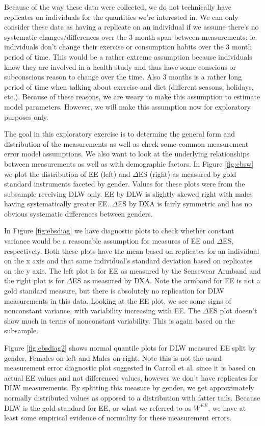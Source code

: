\documentclass[11pt]{article}\usepackage[]{graphicx}\usepackage[]{color}
\begin{document}
Because of the way these data were collected, we do not technically have replicates on individuals for the quantities we're interested in. We can only consider these data as having a replicate on an individual if we assume there's no systematic changes/differences over the 3 month span between measurements; ie. individuals don't change their exercise or consumption habits over the 3 month period of time. This would be a rather extreme assumption because individuals know they are involved in a health study and thus have some conscious or subconscious reason to change over the time. Also 3 months is a rather long period of time when talking about exercise and diet (different seasons, holidays, etc.). Because of these reasons, we are weary to make this assumption to estimate model parameters. However, we will make this assumption now for exploratory purposes only. 

The goal in this exploratory exercise is to determine the general form and distribution of the measurements as well as check some common measurement error model assumptions. We also want to look at the underlying relationships between measurements as well as with demographic factors. In Figure \eqref{fig:ebsw} we  plot the distribution of EE (left) and $\Delta$ES (right) as measured by gold standard instruments faceted by gender. Values for these plots were from the subsample receiving DLW only. EE by DLW is slightly skewed right with males having systematically greater EE. $\Delta$ES by DXA is fairly symmetric and has no obvious systematic differences between genders. 

In Figure \eqref{fig:ebsdiag} we have diagnostic plots to check whether constant variance would be a reasonable assumption for measures of EE and $\Delta$ES, respectively. Both these plots have the mean based on replicates for an individual on the x axis and that same individual's standard deviation based on replicates on the y axis. The left plot is for EE as measured by the Sensewear Armband and the right plot is for $\Delta$ES as measured by DXA. Note the armband for EE is not a gold standard measure, but there is absolutely no replication for DLW measurements in this data. Looking at the EE plot, we see some signs of nonconstant variance, with variability increasing with EE. The $\Delta$ES plot doesn't show much in terms of nonconstant variability. This is again based on the subsample.

Figure \eqref{fig:ebsdiag2} shows normal quantile plots for DLW measured EE split by gender, Females on left and Males on right. Note this is not the usual measurement error diagnostic plot suggested in Carroll et al. \cite{nonlinear} since it is based on actual EE values and not differenced values, however we don't have replicates for DLW measurements. By splitting this measure by gender, we get approximately normally distributed values as opposed to a distribution with fatter tails. Because DLW is the gold standard for EE, or what we referred to as $W^{EE}$, we have at least some empirical evidence of normality for these measurement errors. 
\end{document}
